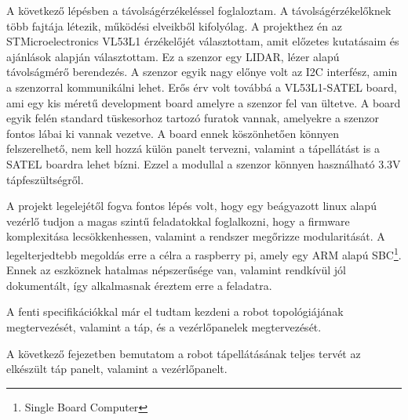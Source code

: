 A következő lépésben a távolságérzékeléssel foglaloztam. A távolságérzékelőknek
több fajtája létezik, működési elveikből kifolyólag. A projekthez én az
STMicroelectronics VL53L1 érzékelőjét választottam, amit előzetes kutatásaim
és ajánlások alapján választottam. Ez a szenzor egy LIDAR, lézer alapú
távolságmérő berendezés. A szenzor egyik nagy előnye volt az I2C interfész, amin
a szenzorral kommunikálni lehet. Erős érv volt továbbá a VL53L1-SATEL board, ami
egy kis méretű development board amelyre a szenzor fel van ültetve. A board
egyik felén standard tüskesorhoz tartozó furatok vannak, amelyekre a szenzor 
fontos lábai ki vannak vezetve. A board ennek köszönhetően könnyen felszerelhető,
nem kell hozzá külön panelt tervezni, valamint a tápellátást is a SATEL boardra
lehet bízni. Ezzel a modullal a szenzor könnyen használható 3.3V
tápfeszültségről.

A projekt legelejétől fogva fontos lépés volt, hogy egy beágyazott linux alapú
vezérlő tudjon a magas szintű feladatokkal foglalkozni, hogy a firmware
komplexitása lecsökkenhessen, valamint a rendszer megőrizze modularitását. A
legelterjedtebb megoldás erre a célra a raspberry pi, amely egy ARM alapú
SBC\footnote{Single Board Computer}. Ennek az eszköznek hatalmas népszerűsége
van, valamint rendkívül jól dokumentált, így alkalmasnak éreztem erre a
feladatra.

A fenti specifikációkkal már el tudtam kezdeni a robot topológiájának
megtervezését, valamint a táp, és a vezérlőpanelek megtervezését.

A következő fejezetben bemutatom a robot tápellátásának teljes tervét az
elkészült táp panelt, valamint a vezérlőpanelt.

